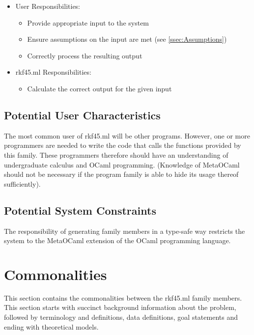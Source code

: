 \documentclass[12pt]{article}
\newcommand{\famname}{rkf45.ml} %
\begin{document}
\begin{itemize}
\item User Responsibilities:
\begin{itemize}
\item Provide appropriate input to the system
\item Ensure assumptions on the input are met (see \autoref{ssec:Assumptions})
\item Correctly process the resulting output
\end{itemize}
\item \famname{} Responsibilities:
\begin{itemize}
\item Calculate the correct output for the given input
\end{itemize}
\end{itemize}

\subsection{Potential User Characteristics} \label{SecUserCharacteristics}

The most common user of \famname{} will be other programs. However, one or more 
programmers are needed to write the code that calls the functions provided by 
this family.
These programmers therefore should have an understanding of undergraduate 
calculus and OCaml programming. (Knowledge of MetaOCaml should not be necessary 
if the program family is able to hide its usage thereof sufficiently).
                                                                                
                          
\subsection{Potential System Constraints}

The responsibility of generating family members in a type-safe way restricts 
the system to the MetaOCaml extension of the OCaml programming language.

\section{Commonalities}

This section contains the commonalities between the \famname{} family members. 
This section starts with succinct background information about the problem, 
followed by terminology and definitions, data definitions, goal statements and 
ending with theoretical models. 
\end{document}
